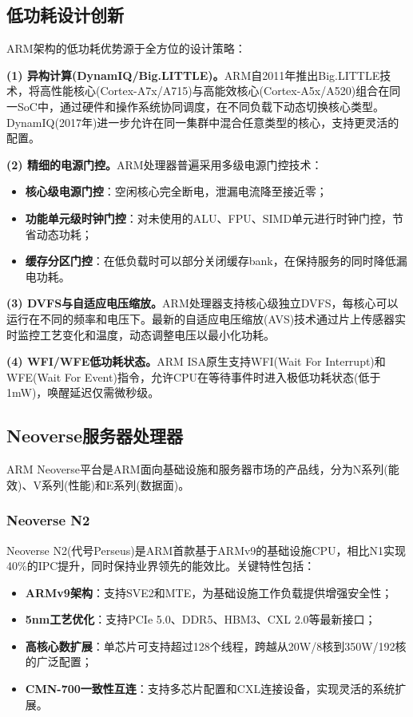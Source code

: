 \documentclass[12pt,a4paper]{IEEEtran}
\begin{document}
\subsection{低功耗设计创新}

ARM架构的低功耗优势源于全方位的设计策略\cite{arm2022power}：

\textbf{(1) 异构计算(DynamIQ/Big.LITTLE)。}ARM自2011年推出Big.LITTLE技术，将高性能核心(Cortex-A7x/A715)与高能效核心(Cortex-A5x/A520)组合在同一SoC中，通过硬件和操作系统协同调度，在不同负载下动态切换核心类型。DynamIQ(2017年)进一步允许在同一集群中混合任意类型的核心，支持更灵活的配置。

\textbf{(2) 精细的电源门控。}ARM处理器普遍采用多级电源门控技术：
\begin{itemize}
\item \textbf{核心级电源门控}：空闲核心完全断电，泄漏电流降至接近零；
\item \textbf{功能单元级时钟门控}：对未使用的ALU、FPU、SIMD单元进行时钟门控，节省动态功耗；
\item \textbf{缓存分区门控}：在低负载时可以部分关闭缓存bank，在保持服务的同时降低漏电功耗。
\end{itemize}

\textbf{(3) DVFS与自适应电压缩放。}ARM处理器支持核心级独立DVFS，每核心可以运行在不同的频率和电压下。最新的自适应电压缩放(AVS)技术通过片上传感器实时监控工艺变化和温度，动态调整电压以最小化功耗。

\textbf{(4) WFI/WFE低功耗状态。}ARM ISA原生支持WFI(Wait For Interrupt)和WFE(Wait For Event)指令，允许CPU在等待事件时进入极低功耗状态(低于1mW)，唤醒延迟仅需微秒级。

\subsection{Neoverse服务器处理器}

ARM Neoverse平台是ARM面向基础设施和服务器市场的产品线，分为N系列(能效)、V系列(性能)和E系列(数据面)\cite{arm2022neoversen2}。

\subsubsection{Neoverse N2}

Neoverse N2(代号Perseus)是ARM首款基于ARMv9的基础设施CPU，相比N1实现40\%的IPC提升，同时保持业界领先的能效比。关键特性包括：
\begin{itemize}
\item \textbf{ARMv9架构}：支持SVE2和MTE，为基础设施工作负载提供增强安全性；
\item \textbf{5nm工艺优化}：支持PCIe 5.0、DDR5、HBM3、CXL 2.0等最新接口；
\item \textbf{高核心数扩展}：单芯片可支持超过128个线程，跨越从20W/8核到350W/192核的广泛配置；
\item \textbf{CMN-700一致性互连}：支持多芯片配置和CXL连接设备，实现灵活的系统扩展。
\end{itemize}
\end{document}
